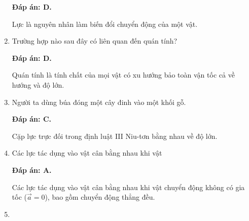 \begin{enumerate}[label=\bfseries Câu \arabic*:]
	\hideall
	{	\textbf{Đáp án: D.}
		
		Lực là nguyên nhân làm biến đổi chuyển động của một vật.
	}
	\item {}
	
	
	{Trường hợp nào sau đây có liên quan đến quán tính?
	}
	
	\hideall
	{	\textbf{Đáp án: D.}	
		
		Quán tính là tính chất của mọi vật có xu hướng bảo toàn vận tốc cả về hướng và độ lớn.
	}
	\item {}
	
	
	{Người ta dùng búa đóng một cây đinh vào một khối gỗ.
	}
	
	\hideall
	{	\textbf{Đáp án: C.}
		
		Cặp lực trực đối trong định luật III Niu-tơn bằng nhau về độ lớn.
	}
	\item {}
	
	
	{Các lực tác dụng vào vật cân bằng nhau khi vật
	}
	
	\hideall
	{	\textbf{Đáp án: A.}
		
		Các lực tác dụng vào vật cân bằng nhau khi vật chuyển động không có gia tốc ($\vec a = 0$), bao gồm chuyển động thẳng đều.
	}
	\item {}
	

\end{enumerate}

